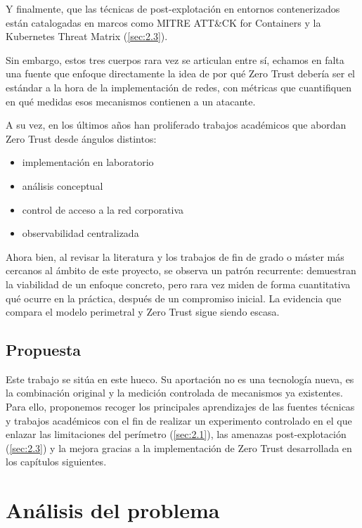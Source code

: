 \documentclass[11pt,spanish,listoffigures,listoftables]{tfgetsinf}
\begin{document}
    Y finalmente, que las técnicas de post-explotación en entornos contenerizados están catalogadas en marcos como MITRE ATT\&CK for Containers y la Kubernetes Threat Matrix (\cref{sec:2.3}). 
    
    Sin embargo, estos tres cuerpos rara vez se articulan entre sí, echamos en falta una fuente que enfoque directamente la idea de por qué Zero Trust debería ser el estándar a la hora de la implementación de redes, con métricas que cuantifiquen en qué medidas esos mecanismos contienen a un atacante.
    
    A su vez, en los últimos años han proliferado trabajos académicos que abordan Zero Trust desde ángulos distintos: 
    \begin{itemize}
        \item implementación en laboratorio
        \item análisis conceptual
        \item control de acceso a la red corporativa
        \item observabilidad centralizada
    \end{itemize}
    
    Ahora bien, al revisar la literatura y los trabajos de fin de grado o máster más cercanos al ámbito de este proyecto, se observa un patrón recurrente: demuestran la viabilidad de un enfoque concreto, pero rara vez miden de forma cuantitativa qué ocurre en la práctica, después de un compromiso inicial. La evidencia que compara el modelo perimetral y Zero Trust sigue siendo escasa.
    
    \section{Propuesta}
    Este trabajo se sitúa en este hueco. Su aportación no es una tecnología nueva, es la combinación original y la medición controlada de mecanismos ya existentes. Para ello, proponemos recoger los principales aprendizajes de las fuentes técnicas y trabajos académicos con el fin de realizar un experimento controlado en el que enlazar las limitaciones del perímetro (\cref{sec:2.1}), las amenazas post-explotación (\cref{sec:2.3}) y la mejora gracias a la implementación de Zero Trust desarrollada en los capítulos siguientes.


\chapter{Análisis del problema}
 
\end{document}
